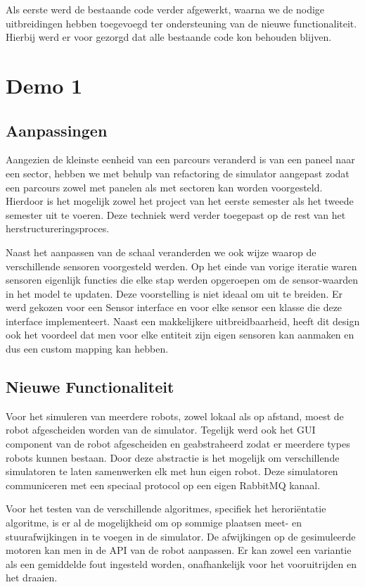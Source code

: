 \documentclass[12pt,a4paper]{report}
\begin{document}
Als eerste werd de bestaande code verder afgewerkt, waarna we de nodige uitbreidingen hebben toegevoegd ter ondersteuning van de nieuwe functionaliteit. Hierbij werd er voor gezorgd dat alle bestaande code kon behouden blijven.

\section{Demo 1}

\subsection{Aanpassingen}

Aangezien de kleinste eenheid van een parcours veranderd is van een paneel naar een sector, hebben we met behulp van refactoring de simulator aangepast zodat een parcours zowel met panelen als met sectoren kan worden voorgesteld. Hierdoor is het mogelijk zowel het project van het eerste semester als het tweede semester uit te voeren. Deze techniek werd verder toegepast op de rest van het herstructureringsproces. 

Naast het aanpassen van de schaal veranderden we ook wijze waarop de verschillende sensoren voorgesteld werden. Op het einde van vorige iteratie waren sensoren eigenlijk functies die elke stap werden opgeroepen om de sensor-waarden in het model te updaten. Deze voorstelling is niet ideaal om uit te breiden. Er werd gekozen voor een Sensor interface en voor elke sensor een klasse die deze interface implementeert. Naast een makkelijkere uitbreidbaarheid, heeft dit design ook het voordeel dat men voor elke entiteit zijn eigen sensoren kan aanmaken en dus een custom mapping kan hebben.

\subsection{Nieuwe Functionaliteit}

Voor het simuleren van meerdere robots, zowel lokaal als op afstand, moest de robot afgescheiden worden van de simulator. Tegelijk werd ook het GUI component van de robot afgescheiden en geabstraheerd zodat er meerdere types robots kunnen bestaan. Door deze abstractie is het mogelijk om verschillende simulatoren te laten samenwerken elk met hun eigen robot. Deze simulatoren communiceren met een speciaal protocol op een eigen RabbitMQ kanaal.

Voor het testen van de verschillende algoritmes, specifiek het herori\"entatie algoritme, is er al de mogelijkheid om op sommige plaatsen meet- en stuurafwijkingen in te voegen in de simulator. De afwijkingen op de gesimuleerde motoren kan men in de API van de robot aanpassen. Er kan zowel een variantie als een gemiddelde fout ingesteld worden, onafhankelijk voor het vooruitrijden en het draaien.
\end{document}
